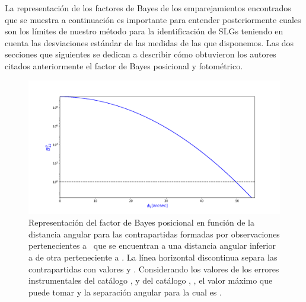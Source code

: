 La representación de los factores de Bayes de los emparejamientos encontrados que se muestra a continuación es importante para entender posteriormente cuales son los límites de nuestro método para la identificación de SLGs teniendo en cuenta las desviaciones estándar de las medidas de las que disponemos.
Las dos secciones que siguientes se dedican a describir cómo obtuvieron los autores citados anteriormente el factor de Bayes posicional y fotométrico.

\newpage

\begin{figure}[H]
    \begin{center}
         \includegraphics[width=\textwidth]{4_cross_identificacion/matching_ghbayes_posmatching_gh.png}
    \end{center}
    \vspace*{-10mm}
    \caption{\small Representación del factor de Bayes posicional en función de la distancia angular para las contrapartidas formadas por observaciones pertenecientes a \hatlas\ que se encuentran a una distancia angular inferior a  de otra perteneciente a \gama. La línea horizontal discontinua separa las contrapartidas con valores  y . Considerando los valores de los errores instrumentales del catálogo \gama,  y del catálogo \hatlas,  , el valor máximo que puede tomar  y la separación angular para la cual  es .}
    \label{fig:bayes_posicional}
\end{figure}

\vspace{-5mm}

